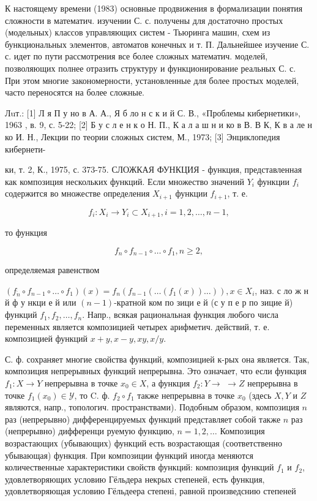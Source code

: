 \documentclass[10pt]{article}
\begin{document}
К настоящему времени (1983) основные продвижения в формализации понятия сложности в математич. изучении С. с. получены для достаточно простых (модельных) классов управляющих систем - Тьюринга машин, схем из бункциональных элементов, автоматов конечных и т. П. Дальнейшее изучение С. с. идет по пути рассмотрения все более сложных математич. моделей, позволяющих полнее отразить структуру и функционирование реальных С. с. При этом многие закономерности, установленные для более простых моделей, часто переносятся на более сложные.



Лuт.: [1] Л я П у но в А. А., Я б ло н с к и й С. В., «Проблемы кибернетики», 1963 , в. 9, с. 5-22; [2] Б у с л е н к о Н. П., К а л а ш н и ко в В. В К, К в а ле н ко И. Н., Лекции по теории сложных систем, М., 1973; [3] Энциклопедия кибернети-

ки, т. 2, К., 1975, с. 373-75. СЛОЖКАЯ ФУНКЦИЯ - функция, представленная как композиция нескольких функций. Если множество значений $Y_{i}$ функции $f_{i}$ содержится во множестве определения $X_{i+1}$ функции $f_{i+1}$, т. е.



\[

f_{i}: X_{i} \longrightarrow Y_{i} \subset X_{i+1}, i=1,2, \ldots, n-1,

\]



то функция



\[

f_{n} \circ f_{n-1} \circ \ldots \circ f_{1}, n \geqslant 2,

\]



определяемая равенством



$\left(f_{\grave{n}} \circ f_{n-1} \circ \ldots \circ f_{1}\right)(x)=f_{n}\left(f_{n-1}\left(\ldots\left(f_{1}(x)\right) \ldots\right)\right), x \in X_{i}$, наз. с ло ж н й ф у нкци е й или $(n-1)$-кратной ком по зици е й (с у п е р по зицие й) функций $f_{1}, f_{2}, \ldots, f_{n}$. Напр., всякая рациональная функция любого числа переменных является композицией четырех арифметич. действий, т. е. композицией функций $x+y, x-y, x y, x / y$.



С. ф. сохраняет многие свойства функций, композицией к-рых она является. Так, композиция непрерывных функций непрерывна. Это означает, что если функция $f_{1}: X \rightarrow Y$ непрерывна в точке $x_{0} \in X$, а функция $f_{2}: Y \rightarrow$ $\rightarrow Z$ непрерывна в точке $f_{1}\left(x_{0}\right) \in \mathcal{Y}$, то C. ф. $f_{2} \circ f_{1}$ также непрерывна в точке $x_{0}$ (здесь $X, Y$ и $Z$ являются, напр., топологич. пространствами). Подобным образом, композиция $n$ раз (непрерывно) дифференцируемых функций представляет собой также $n$ раз (непрерывно) дифференци руемую функцию, $n=1,2, \ldots$ Композиция возрастающих (убывающих) функций есть возрастающая (соответственно убывающая) функция. При композиции функций иногда меняются количественные характеристики свойств функций: композиция функций $f_{1}$ и $f_{2}$, удовлетворяющих условию Гёльдера некрых степеней, есть функция, удовлетворяющая условию Гёльдеера степені, равной произведснию степеней
\end{document}
